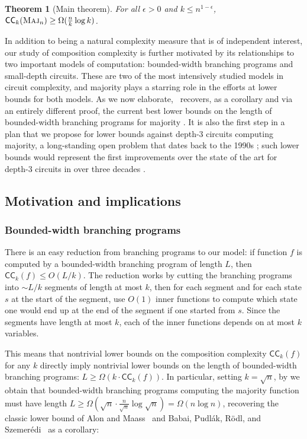 \documentclass[10pt,a4paper]{article}
\newtheorem{theorem}{Theorem}
\theoremstyle{definition}
\theoremstyle{remark}
\newcommand{\mathsc}[1]{{\normalfont\textsc{#1}}}
\newcommand{\eps}{\epsilon}
\DeclareMathOperator{\Maj}{\mathsc{Maj}}
\newcommand{\Majority}{\Maj}
\newcommand{\CC}{\mathsf{CC}}
\begin{document}
\begin{theorem}[Main theorem]\label{thm:main}
For all $\eps > 0$ and $k \leq n^{1 - \eps}$, $\CC_k(\Majority_n) \geq \Omega(\frac{n}{k} \log k)$.
\end{theorem}



In addition to being a natural complexity measure that is of independent interest, our study of composition complexity is further motivated by its relationships to two important models of computation: bounded-width branching programs and small-depth circuits.
These are two of the most intensively studied models in circuit complexity, and majority plays a starring role in the efforts at lower bounds for both models.
As we now elaborate,~ recovers, as a corollary and via an entirely different proof, the current best lower bounds on the length of bounded-width branching programs for majority \cite{AM86,BPRS90}.
It is also the first step in a plan that we propose for lower bounds against depth-$3$ circuits computing majority, a long-standing open problem that dates back to the 1990s \cite{HJP93}; such lower bounds would represent the first improvements over the state of the art for depth-$3$ circuits in over three decades \cite{Has86}.

\subsection{Motivation and implications}\label{sec:motives}

\subsubsection{Bounded-width branching programs}
There is an easy reduction from branching programs to our model: if function $f$ is computed by a bounded-width branching program of length $L$,
then $\CC_k(f) \leq O(L/k)$.
The reduction works by cutting the branching programs into $\sim L/k$ segments of length at most $k$, then for each segment and for each state $s$ at the start of the segment, use
$O(1)$
inner functions to compute which state one would end up at the end of the segment if one started from $s$.
Since the segments have length at most $k$, each of the inner functions depends on at most $k$ variables.

This means that nontrivial lower bounds on the composition complexity $\CC_k(f)$ for any $k$ directly imply nontrivial lower bounds on the length of bounded-width branching programs: $L \geq \Omega(k \cdot \CC_k(f))$.
In particular, setting $k=\sqrt{n}$, by  we obtain that bounded-width branching programs computing the majority function must have length $L \geq \Omega(\sqrt{n} \cdot \frac{n}{\sqrt{n}} \log \sqrt{n}) = \Omega(n \log n)$, recovering the classic lower bound of Alon and Maass~\cite{AM86} and Babai, Pudl{\'a}k, R{\"o}dl, and Szemer{\'e}di~\cite{BPRS90} as a corollary: 
\end{document}
